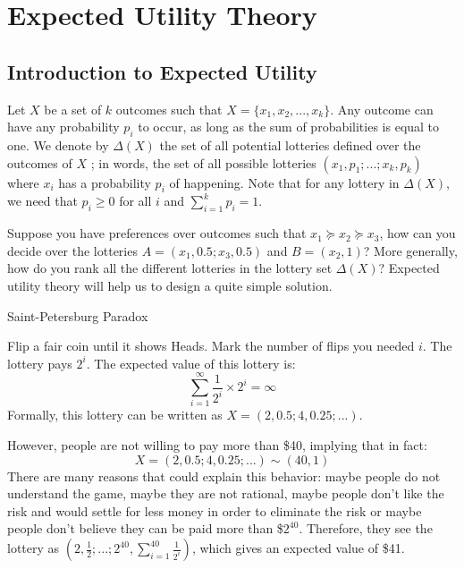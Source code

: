 \documentclass[12pt]{report}
\begin{document}
\chapter{Expected Utility Theory}

\section{Introduction to Expected Utility}

Let $X$ be a set of $k$ outcomes such that $X = \{x_1, x_2, ..., x_k\}$. Any outcome can have any probability $p_i$ to occur, as long as the sum of probabilities is equal to one. We denote by $\Delta (X)$ the set of all potential lotteries defined over the outcomes of $X$ ; in words, the set of all possible lotteries $(x_1, p_1; ...; x_k,p_k)$ where $x_i$ has a probability $p_i$ of happening. Note that for any lottery in $\Delta(X)$, we need that $p_i \geq 0$ for all $i$ and $\sum_{i=1}^{k} p_i = 1$.

Suppose you have preferences over outcomes such that $x_1\succeq x_2\succeq x_3$, how can you decide over the lotteries $A = (x_1, 0.5 ; x_3, 0.5)$ and $B = (x_2, 1)$? More generally, how do you rank all the different lotteries in the lottery set $\Delta (X)$? Expected utility theory will help us to design a quite simple solution.

\begin{bclogo}[couleur=blue!10, arrondi=0.1, logo=,ombre=false]{ Saint-Petersburg Paradox} 
\begin{small}
Flip a fair coin until it shows Heads. Mark the number of flips you needed $i$. The lottery pays $2^i$. The expected value of this lottery is: $$\sum_{i=1}^{\infty} \frac{1}{2^i}\times 2^i = \infty $$ Formally, this lottery can be written as $X = (2, 0.5; 4, 0.25; ... )$.

However, people are not willing to pay more than \$40, implying that in fact: $$X = (2, 0.5; 4, 0.25; ... ) \sim (40, 1) $$ There are many reasons that could explain this behavior: maybe people do not understand the game, maybe they are not rational, maybe people don't like the risk and would settle for less money in order to eliminate the risk or maybe people don't believe they can be paid more than 
\$$2^{40}$. Therefore, they see the lottery as $\left( 2, \frac{1}{2}; ...; 2^{40}, \sum_{i=1}^{40} \frac{1}{2^i}\right)$, which gives an expected value of \$41.
\end{small}
\end{bclogo}
\end{document}
